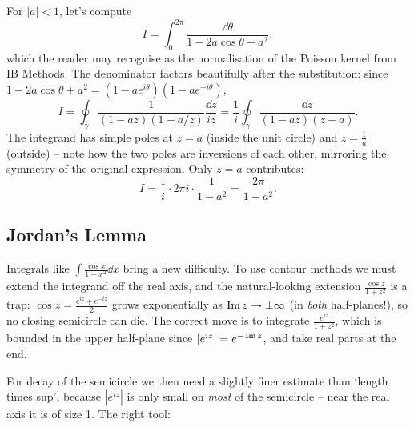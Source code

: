 \documentclass[a4paper]{scrartcl}
\begin{document}
\begin{example}
	For $|a| < 1$, let's compute
	$$
	I = \int_0^{2\pi} \frac{\dd \theta}{1 - 2a\cos\theta + a^2},
	$$
	which the reader may recognise as the normalisation of the Poisson kernel from IB Methods. The denominator factors beautifully after the substitution: since $1 - 2a\cos\theta + a^2 = (1 - ae^{i\theta})(1 - ae^{-i\theta})$,
	$$
	I = \oint_\gamma \frac{1}{(1 - az)(1 - a/z)} \frac{\dd z}{iz} = \frac 1i \oint_\gamma \frac{\dd z}{(1 - az)(z - a)}.
	$$
	The integrand has simple poles at $z = a$ (inside the unit circle) and $z = \frac 1a$ (outside) -- note how the two poles are inversions of each other, mirroring the symmetry of the original expression. Only $z = a$ contributes:
	$$
	I = \frac 1i \cdot 2\pi i \cdot \frac{1}{1 - a^2} = \frac{2\pi}{1 - a^2}.
	$$
\end{example}

\subsection{Jordan's Lemma}

Integrals like $\int \frac{\cos x}{1 + x^2} \dd x$ bring a new difficulty. To use contour methods we must extend the integrand off the real axis, and the natural-looking extension $\frac{\cos z}{1 + z^2}$ is a trap: $\cos z = \frac{e^{iz} + e^{-iz}}{2}$ grows exponentially as $\operatorname{Im} z \to \pm\infty$ (in \emph{both} half-planes!), so no closing semicircle can die. The correct move is to integrate $\frac{e^{iz}}{1 + z^2}$, which is bounded in the upper half-plane since $|e^{iz}| = e^{-\operatorname{Im} z}$, and take real parts at the end.

For decay of the semicircle we then need a slightly finer estimate than `length times sup', because $|e^{iz}|$ is only small on \emph{most} of the semicircle -- near the real axis it is of size 1. The right tool:
\end{document}

